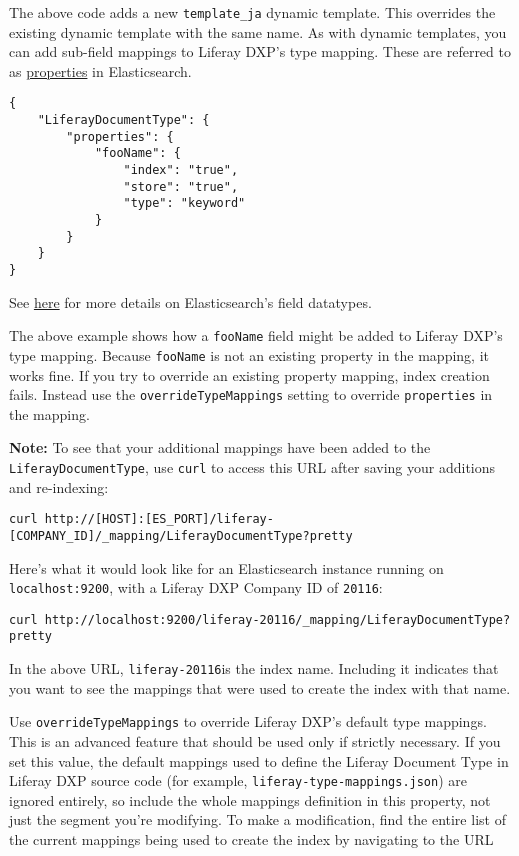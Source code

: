 The above code adds a new \texttt{template\_ja} dynamic template. This
overrides the existing dynamic template with the same name. As with
dynamic templates, you can add sub-field mappings to Liferay DXP's type
mapping. These are referred to as
\href{https://www.elastic.co/guide/en/elasticsearch/reference/6.1/properties.html}{properties}
in Elasticsearch.

\begin{verbatim}
{ 
    "LiferayDocumentType": {  
        "properties": {   
            "fooName": {
                "index": "true",
                "store": "true",
                "type": "keyword"
            }
        }   
    }
}
\end{verbatim}

See
\href{https://www.elastic.co/guide/en/elasticsearch/reference/6.1/mapping-types.html}{here}
for more details on Elasticsearch's field datatypes.

The above example shows how a \texttt{fooName} field might be added to
Liferay DXP's type mapping. Because \texttt{fooName} is not an existing
property in the mapping, it works fine. If you try to override an
existing property mapping, index creation fails. Instead use the
\texttt{overrideTypeMappings} setting to override \texttt{properties} in
the mapping.

\textbf{Note:} To see that your additional mappings have been added to
the \texttt{LiferayDocumentType}, use \texttt{curl} to access this URL
after saving your additions and re-indexing:

\begin{verbatim}
curl http://[HOST]:[ES_PORT]/liferay-[COMPANY_ID]/_mapping/LiferayDocumentType?pretty
\end{verbatim}

Here's what it would look like for an Elasticsearch instance running on
\texttt{localhost:9200}, with a Liferay DXP Company ID of
\texttt{20116}:

\begin{verbatim}
curl http://localhost:9200/liferay-20116/_mapping/LiferayDocumentType?pretty
\end{verbatim}

In the above URL, \texttt{liferay-20116}is the index name. Including it
indicates that you want to see the mappings that were used to create the
index with that name.

\noindent\hrulefill

Use \texttt{overrideTypeMappings} to override Liferay DXP's default type
mappings. This is an advanced feature that should be used only if
strictly necessary. If you set this value, the default mappings used to
define the Liferay Document Type in Liferay DXP source code (for
example, \texttt{liferay-type-mappings.json}) are ignored entirely, so
include the whole mappings definition in this property, not just the
segment you're modifying. To make a modification, find the entire list
of the current mappings being used to create the index by navigating to
the URL

